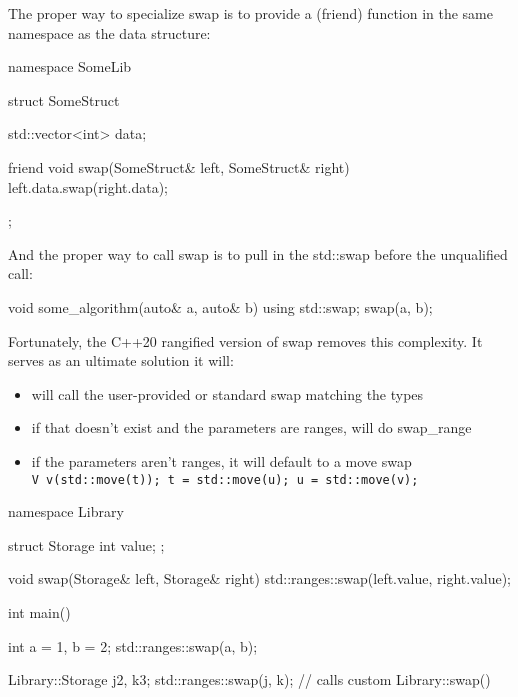 The proper way to specialize swap is to provide a (friend) function in the same namespace as the data structure:

\begin{box-note}
\begin{cppcode}
namespace SomeLib {

struct SomeStruct {
    std::vector<int> data;

    friend void swap(SomeStruct& left, SomeStruct& right) {
        left.data.swap(right.data);
    }
};

}
\end{cppcode}
\end{box-note}

And the proper way to call swap is to pull in the std::swap before the unqualified call:

\begin{box-note}
\begin{cppcode}
void some_algorithm(auto& a, auto& b) {
    using std::swap;
    swap(a, b);
}
\end{cppcode}
\end{box-note}

Fortunately, the C++20 rangified version of swap removes this complexity. It serves as an ultimate solution it will:

\begin{itemize}
    \item will call the user-provided or standard swap matching the types
    \item if that doesn’t exist and the parameters are ranges, will do swap\_range
    \item if the parameters aren’t ranges, it will default to a move swap\\
    \texttt{V v(std::move(t)); t = std::move(u); u = std::move(v);}
\end{itemize}

\begin{box-note}
\begin{cppcode}
namespace Library {
struct Storage {
    int value;
};

void swap(Storage& left, Storage& right) {
    std::ranges::swap(left.value, right.value);
}
}

int main() {
    int a = 1, b = 2;
    std::ranges::swap(a, b);

    Library::Storage j{2}, k{3};
    std::ranges::swap(j, k); // calls custom Library::swap()
}
\end{cppcode}
\end{box-note}

